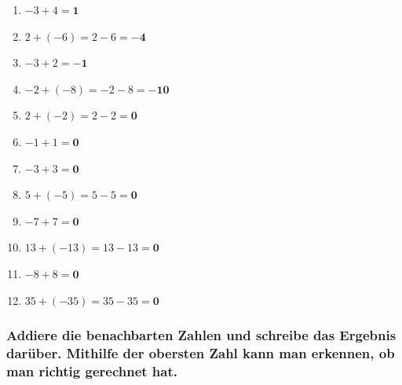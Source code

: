 \documentclass[a4paper,10pt]{article} %
\begin{document}
\begin{enumerate}
  \item \(-3 + 4 =
    \mathbf{1}\) %

  \item \(2 + (-6) =
    2 - 6 =
    \mathbf{-4}\) %

  \item \(-3 + 2 =
    \mathbf{-1}\) %

  \item \(-2 + (-8) =
    -2 - 8 =
    \mathbf{-10}\) %

  \item \(2 + (-2) =
    2 - 2 =
    \mathbf{0}\) %

  \item \(-1 + 1 =
    \mathbf{0}\) %

  \item \(-3 + 3 =
    \mathbf{0}\) %

  \item \(5 + (-5) =
    5 - 5 =
    \mathbf{0}\) %

  \item \(-7 + 7 =
    \mathbf{0}\) %

  \item \(13 + (-13) =
    13 - 13 =
    \mathbf{0}\) %

  \item \(-8 + 8 =
    \mathbf{0}\) %

  \item \(35 + (-35) =
    35 - 35 =
    \mathbf{0}\) %

\end{enumerate}

\subsubsection{Addiere die benachbarten Zahlen und schreibe das Ergebnis darüber.
Mithilfe der obersten Zahl kann man erkennen, ob man richtig gerechnet hat.} %
\end{document}
